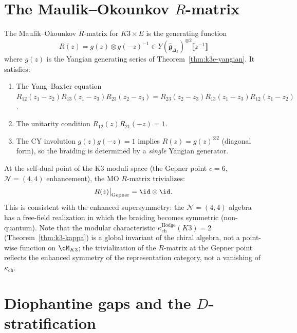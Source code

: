 \section{The Maulik--Okounkov \texorpdfstring{$R$}{R}-matrix}
\label{sec:k3e-mo-rmatrix}

\begin{theorem}
\label{thm:k3e-mo-rmatrix}
The Maulik--Okounkov $R$-matrix for $K3 \times E$ is the generating function
\[
 R(z) = g(z) \otimes g(-z)^{-1} \in Y(\widehat{\mathfrak{g}}_{\Delta_5})^{\otimes 2}\llbracket z^{-1} \rrbracket
\]
where $g(z)$ is the Yangian generating series of Theorem~\ref{thm:k3e-yangian}. It satisfies:
\begin{enumerate}[label=(\roman*)]
 \item The Yang--Baxter equation $R_{12}(z_1 - z_2) R_{13}(z_1 - z_3) R_{23}(z_2 - z_3) = R_{23}(z_2 - z_3) R_{13}(z_1 - z_3) R_{12}(z_1 - z_2)$.
 \item The unitarity condition $R_{12}(z) R_{21}(-z) = 1$.
 \item The CY involution $g(z) g(-z) = 1$ implies $R(z) = g(z)^{\otimes 2}$ (diagonal form), so the braiding is determined by a \emph{single} Yangian generator.
\end{enumerate}
\end{theorem}

\begin{conjecture}
\label{conj:k3e-self-dual-limit}
At the self-dual point of the K3 moduli space (the Gepner point $c = 6$, $\mathcal{N} = (4,4)$ enhancement), the MO $R$-matrix trivializes:
\[
 R(z)\big|_{\mathrm{Gepner}} = \id \otimes \id.
\]
This is consistent with the enhanced supersymmetry: the $\mathcal{N} = (4,4)$ algebra has a free-field realization in which the braiding becomes symmetric (non-quantum). Note that the modular characteristic $\kappa_{\mathrm{ch}}^{\mathrm{Hodge}}(K3) = 2$ (Theorem~\ref{thm:k3-kappa}) is a global invariant of the chiral algebra, not a point-wise function on $\cM_{K3}$; the trivialization of the $R$-matrix at the Gepner point reflects the enhanced symmetry of the representation category, not a vanishing of $\kappa_{\mathrm{ch}}$.
\end{conjecture}


\section{Diophantine gaps and the \texorpdfstring{$D$}{D}-stratification}
\label{sec:k3e-diophantine}

